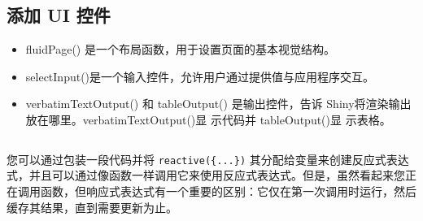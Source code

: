 \chapter{\label{ch01}}
\section{添加 UI 控件}
\begin{itemize}
    \item fluidPage() 是一个布局函数，用于设置页面的基本视觉结构。
    \item selectInput()是一个输入控件，允许用户通过提供值与应用程序交互。
    \item verbatimTextOutput() 和 tableOutput() 是输出控件，告诉 Shiny将渲染输出放在哪里。verbatimTextOutput()显 示代码并 tableOutput()显 示表格。
\end{itemize}
\section{}
您可以通过包装一段代码并将 \verb|reactive({...})| 其分配给变量来创建反应式表达式，并且可以通过像函数一样调用它来使用反应式表达式。但是，虽然看起来您正在调用函数，但响应式表达式有一个重要的区别：它仅在第一次调用时运行，然后缓存其结果，直到需要更新为止。